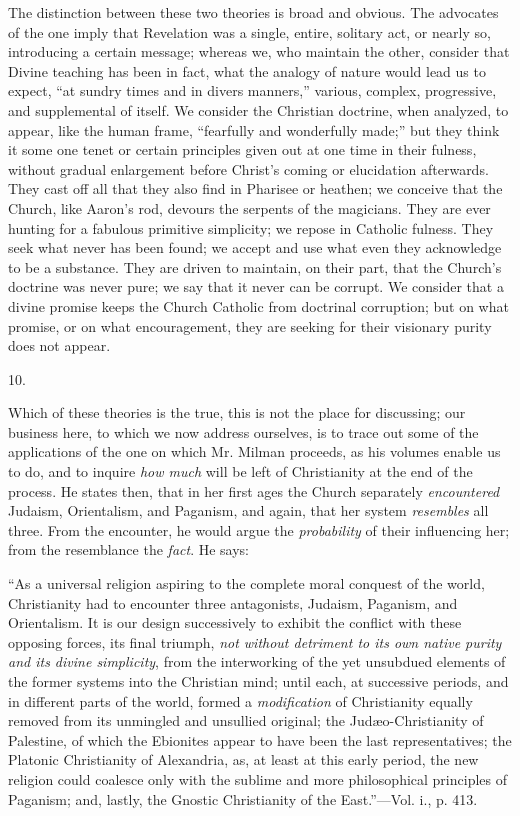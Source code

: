 The distinction between these two theories is
broad and obvious. The advocates of the one imply that Revelation was
a single, entire, solitary act, or nearly so, introducing a certain
message; whereas we, who maintain the other, consider that Divine
teaching has been in fact, what the analogy of nature would lead us to
expect, ``at sundry times and in divers manners,'' various, complex,
progressive, and supplemental of itself. We consider the Christian
doctrine, when analyzed, to appear, like the human frame, ``fearfully
and wonderfully made;'' but they think it some one tenet or certain
principles given out at one time in their fulness, without gradual
enlargement before Christ's coming or elucidation afterwards. They
cast off all that they also find in Pharisee or heathen; we conceive
that the Church, like Aaron's rod, devours the serpents of the
magicians. They are ever hunting for a fabulous primitive simplicity;
we repose in Catholic fulness. They seek what never has been found; we
accept and use what even they acknowledge to be a substance.
They are driven to maintain, on their part, that the Church's doctrine
was never pure; we say that it never can be corrupt. We consider that
a divine promise keeps the Church Catholic from doctrinal corruption;
but on what promise, or on what encouragement, they are seeking for
their visionary purity does not appear.

10.

Which of these theories is the true, this is not
the place for discussing; our business here, to which we now address
ourselves, is to trace out some of the applications of the one on
which Mr. Milman proceeds, as his volumes enable us to do, and to
inquire \emph{how much} will be left of Christianity at the end of the
process. He states then, that in her first ages the Church separately \emph{encountered}
Judaism, Orientalism, and Paganism, and again, that her system \emph{resembles}
all three. From the encounter, he would argue the \emph{probability}
of their influencing her; from the resemblance the \emph{fact}. He
says:

``As
a universal religion aspiring to the complete moral conquest of the
world, Christianity had to encounter three antagonists, Judaism,
Paganism, and Orientalism. It is our design successively to exhibit
the conflict with these opposing forces, its final triumph, \emph{not
without detriment to its own native purity and its divine simplicity},
from the interworking of the yet unsubdued elements of the former
systems into the Christian mind; until each, at successive periods,
and in different parts of the world, formed a \emph{modification} of
Christianity equally removed from its unmingled and unsullied
original; the Judæo-Christianity of Palestine, of which the Ebionites
appear to have been the last representatives; the Platonic
Christianity of Alexandria, as, at least at this early period, the new
religion could coalesce only with the sublime and more philosophical
principles of Paganism; and, lastly, the Gnostic Christianity of the
East.''—Vol. i., p. 413.


